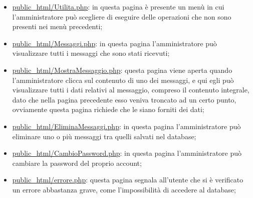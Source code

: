 {\begin{itemize}
		\item \href{http://tecnologie-web.studenti.math.unipd.it/tecweb/~pgabelli/public\_html/Utilita.php}{public\_html/Utilita.php}: in questa pagina è presente un menù in cui l'amministratore può scegliere di eseguire delle operazioni che non sono presenti nei menù precedenti;
		\item \href{http://tecnologie-web.studenti.math.unipd.it/tecweb/~pgabelli/public\_html/Messaggi.php}{public\_html/Messaggi.php}: in questa pagina l'amministratore può visualizzare tutti i messaggi che sono stati ricevuti;
		\item \href{http://tecnologie-web.studenti.math.unipd.it/tecweb/~pgabelli/public\_html/MostraMessaggio.php}{public\_html/MostraMessaggio.php}: questa pagina viene aperta quando l'amministratore clicca sul contenuto di uno dei messaggi, e qui egli può visualizzare tutti i dati relativi al messaggio, compreso il contenuto integrale, dato che nella pagina precedente esso veniva troncato ad un certo punto, ovviamente questa pagina richiede che le siano forniti dei dati;
		\item \href{http://tecnologie-web.studenti.math.unipd.it/tecweb/~pgabelli/public\_html/EliminaMessaggi.php}{public\_html/EliminaMessaggi.php}: in questa pagina l'amministratore può eliminare uno o più messaggi tra quelli salvati nel database;
		\item \href{http://tecnologie-web.studenti.math.unipd.it/tecweb/~pgabelli/public\_html/CambioPassword.php}{public\_html/CambioPassword.php}: in questa pagina l'amministratore può cambiare la password del proprio account;
		\item \href{http://tecnologie-web.studenti.math.unipd.it/tecweb/~pgabelli/public\_html/errore.php}{public\_html/errore.php}: questa pagina segnala all'utente che si è verificato un errore abbastanza grave, come l'impossibilità di accedere al database;
	\end{itemize}
}